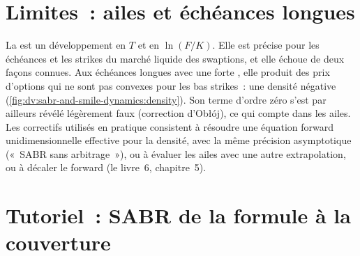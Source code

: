 \section{Limites~: ailes et échéances longues}

La  est un développement en $T$ et en $\ln(F/K)$. Elle est précise pour les échéances et les strikes du
marché liquide des swaptions, et elle échoue de deux façons connues. Aux échéances longues avec une forte , elle produit des prix d'options qui ne sont pas convexes pour les bas strikes~: une densité négative
(\cref{fig:dv:sabr-and-smile-dynamics:density}). Son terme d'ordre zéro s'est par ailleurs révélé légèrement faux
(correction d'Obłój), ce qui compte dans les ailes. Les correctifs utilisés en pratique consistent à résoudre une équation
forward unidimensionnelle effective pour la densité, avec la même précision asymptotique («~SABR sans arbitrage~»), ou
à évaluer les ailes avec une autre extrapolation, ou à décaler le forward (le livre~6, chapitre~5).

\begin{omfigure}

\label{fig:dv:sabr-and-smile-dynamics:density}
\end{omfigure}

\section{Tutoriel~: SABR de la formule à la couverture}\label{tut:dv:sabr-and-smile-dynamics:tut}

